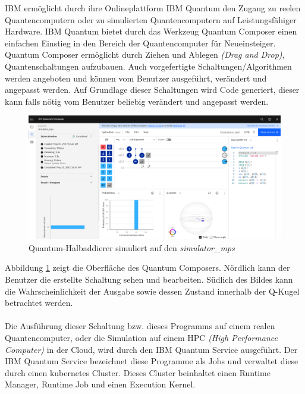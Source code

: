 IBM erm\"oglicht durch ihre Onlineplattform IBM Quantum \cite{IBM_Quantum} den Zugang zu reelen Quantencomputern oder zu simulierten Quantencomputern auf Leistungsf\"ahiger Hardware. IBM Quantum bietet durch das Werkzeug Quantum Composer einen einfachen Einstieg in den Bereich der Quantencomputer f\"ur Neueinsteiger. Quantum Composer erm\"oglicht durch Ziehen und Ablegen \textit{(Drag and Drop)}, Quantenschaltungen aufzubauen. Auch vorgefertigte Schaltungen/Algorithmen werden angeboten und k\"onnen vom Benutzer ausgef\"uhrt, ver\"andert und angepasst werden. Auf Grundlage dieser Schaltungen wird Code generiert, dieser kann falls n\"otig vom Benutzer beliebig ver\"andert und angepasst werden.
\begin{figure}[h]
\centering
\includegraphics[width=1\textwidth]{figures/half_adder_composer.png}
\caption{Quantum-Halbaddierer simuliert auf den \textit{simulator_mps}}
\label{fig:quantum-composer}
\end{figure}
Abbildung \ref{fig:quantum-composer} zeigt die Oberfl\"ache des Quantum Composers. N\"ordlich kann der Benutzer die erstellte Schaltung sehen und bearbeiten. S\"udlich des Bildes kann die Wahrscheinlichkeit der Ausgabe sowie dessen Zustand innerhalb der Q-Kugel betrachtet werden. \\\\
Die Ausf\"uhrung dieser Schaltung bzw. dieses Programms auf einem realen Quantencomputer, oder die Simulation auf einem HPC \textit{(High Performance Computer)} in der Cloud, wird durch den IBM Quantum Service ausgef\"uhrt. Der IBM Quantum Service bezeichnet diese Programme als Jobs und verwaltet diese durch einen kubernetes Cluster. Dieses Cluster beinhaltet einen Runtime Manager, Runtime Job und einen Execution Kernel.\\\\
